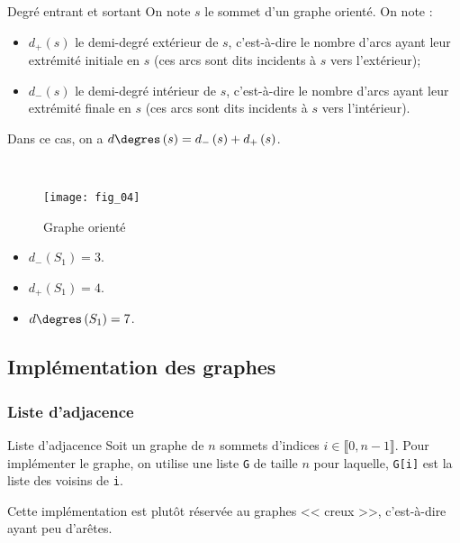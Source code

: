 \begin{defi}{Degré entrant et sortant}
On note $s$ le sommet d'un graphe orienté. On note : 
\begin{itemize}
\item $d_{+}\left(s\right)$ le demi-degré extérieur de $s$, c'est-à-dire le nombre d'arcs ayant leur extrémité initiale en $s$ (ces arcs sont dits incidents à $s$ vers l'extérieur);
\item $d_{-}\left(s\right)$ le demi-degré intérieur de $s$, c'est-à-dire le nombre d'arcs ayant leur extrémité finale en $s$ (ces arcs sont dits incidents à $s$ vers l'intérieur).
\end{itemize}

Dans ce cas, on a  $d\degres\left(s\right)=d_{-}\left(s\right)+d_{+}\left(s\right)$.
\end{defi}


\begin{exemple}~\\

\begin{multicols}{2}
\begin{figure}[H]
\centering
\texttt{[image: fig\_04]}
\captionsetup{justification=centering}
\caption{Graphe orienté \label{fig_04}}
\end{figure}

\begin{itemize}
\item $d_{-}\left(S_1\right)=3$.
\item $d_{+}\left(S_1\right)=4$.
\item $d\degres\left(S_1\right)=7$.
\end{itemize}
\end{multicols}

\end{exemple}

\subsection{Implémentation des graphes}

\subsubsection{Liste d'adjacence}
\begin{defi}{Liste d'adjacence}
Soit un graphe de $n$ sommets d'indices $i \in \llbracket 0, n-1\rrbracket$. Pour implémenter le graphe, on utilise une liste \texttt{G} de taille $n$ pour laquelle, \texttt{G[i]} est la liste des voisins de \texttt{i}.
\end{defi}
\begin{rem}
Cette implémentation est plutôt réservée au graphes << creux >>, c'est-à-dire ayant peu d'arêtes.
\end{rem}

